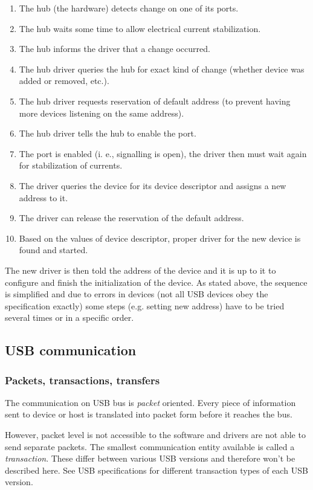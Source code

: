 \begin{enumerate}
\item The hub (the hardware) detects change on one of its ports.
\item The hub waits some time to allow electrical current stabilization.
\item The hub informs the driver that a change occurred.
\item The hub driver queries the hub for exact kind of change (whether device
was added or removed, etc.).
\item The hub driver requests reservation of default address (to prevent having
more devices listening on the same address).
\item The hub driver tells the hub to enable the port.
\item The port is enabled (i. e., signalling is open), the driver then must wait
again for stabilization of currents.
\item The driver queries the device for its device descriptor and assigns a new
address to it.
\item The driver can release the reservation of the default address.
\item Based on the values of device descriptor, proper driver for the new
device is found and started.
\end{enumerate}

The new driver is then told the address of the device and it is up to it to
configure and finish the initialization of the device.
As stated above, the sequence is simplified and due to errors in devices (not
all USB devices obey the specification exactly) some steps (e.g. setting new
address) have to be tried several times or in a specific order.

\subsection{USB communication}

\subsubsection{Packets, transactions, transfers}

The communication on USB bus is \textit{packet} oriented. Every piece of
information sent to device or host is translated into packet form before it
reaches the bus.

However, packet level is not accessible to the software and drivers are not
able to send separate packets. The smallest communication entity available is
called a \textit{transaction}. These differ between various USB versions and
therefore won't be described here. See USB specifications for different
transaction types of each USB version.

